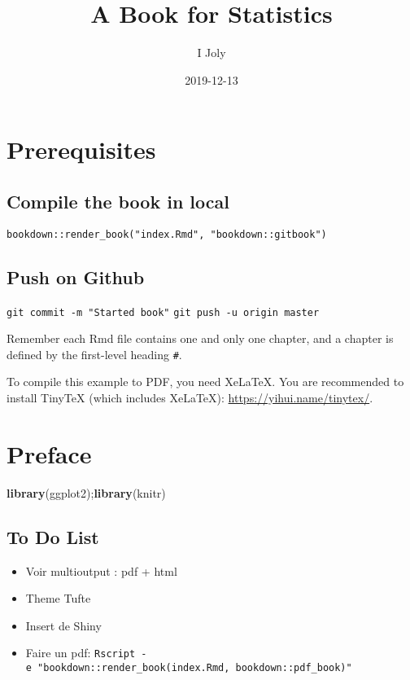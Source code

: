 \documentclass[]{book}
\title{A Book for \textbf{Statistics}}
\author{I Joly}
\date{2019-12-13}
\newenvironment{Shaded}{\begin{snugshade}}{\end{snugshade}}
\newcommand{\KeywordTok}[1]{\textcolor[rgb]{0.13,0.29,0.53}{\textbf{#1}}}
\newcommand{\NormalTok}[1]{#1}
\providecommand{\tightlist}{%
  \setlength{\itemsep}{0pt}\setlength{\parskip}{0pt}}
\begin{document}
\maketitle

{
\setcounter{tocdepth}{1}
\tableofcontents
}
\hypertarget{prerequisites}{%
\chapter{Prerequisites}\label{prerequisites}}

\hypertarget{compile-the-book-in-local}{%
\section{Compile the book in local}\label{compile-the-book-in-local}}

\texttt{bookdown::render\_book("index.Rmd",\ "bookdown::gitbook")}

\hypertarget{push-on-github}{%
\section{Push on Github}\label{push-on-github}}

\texttt{git\ commit\ -m\ "Started\ book"}
\texttt{git\ push\ -u\ origin\ master}

Remember each Rmd file contains one and only one chapter, and a chapter is defined by the first-level heading \texttt{\#}.

To compile this example to PDF, you need XeLaTeX. You are recommended to install TinyTeX (which includes XeLaTeX): \url{https://yihui.name/tinytex/}.

\hypertarget{Preface}{%
\chapter{Preface}\label{Preface}}

\begin{Shaded}
\begin{Highlighting}[]
\KeywordTok{library}\NormalTok{(ggplot2);}\KeywordTok{library}\NormalTok{(knitr)}
\end{Highlighting}
\end{Shaded}

\hypertarget{to-do-list}{%
\section{To Do List}\label{to-do-list}}

\begin{itemize}
\tightlist
\item
  Voir multioutput : pdf + html
\item
  Theme Tufte
\item
  Insert de Shiny
\item
  Faire un pdf: \texttt{Rscript\ -e\ "bookdown::render\_book(\textquotesingle{}index.Rmd\textquotesingle{},\ \textquotesingle{}bookdown::pdf\_book\textquotesingle{})"}
\end{itemize}
\end{document}
